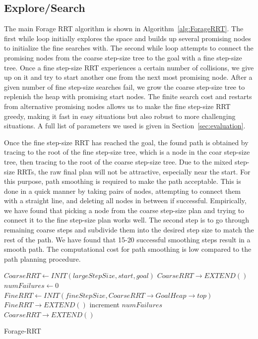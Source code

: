 \documentclass[conference]{IEEEtran}
\begin{document}
\subsection{Explore/Search}
The main Forage RRT algorithm is shown in Algorithm~\ref{alg:ForageRRT}. The
first while loop initially explores the space and builds up several promising 
nodes to initialize the fine searches with. The second while loop attempts to 
connect the promising nodes from the coarse step-size tree to the goal with a 
fine step-size tree. Once a fine step-size RRT experiences a certain number 
of collisions, we give up on it and try to start another one from the next 
most promising node. After a given number of fine step-size searches fail, 
we grow the coarse step-size tree to replenish the heap with promising 
start nodes. The finite search cost and restarts from alternative promising
nodes allows us to make the fine step-size RRT greedy, making it fast in
easy situations but also robust to more challenging situations. A full list
of parameters we used is given in Section~\ref{sec:evaluation}.

Once the fine step-size RRT has reached the goal, the found path is obtained
by tracing to the root of the fine step-size tree, which is a node in the
coar step-size tree, then tracing to the root of the coarse step-size tree.
Due to the mixed step-size RRTs, the raw final plan will not be attractive, 
especially near the start. For this purpose, path smoothing is required to 
make the path acceptable. This is done in a quick manner by taking pairs of
nodes, attempting to connect them with a straight line, and deleting all
nodes in between if successful. Empirically, we have found that
picking a node from the coarse step-size plan and trying to connect it to 
the fine step-size plan works well.  The second step is to go through
remaining coarse steps and subdivide them into the desired step size to
match the rest of the path.  We have found that 15-20 successful smoothing 
steps result in a smooth path.  The computational cost for path smoothing is
low compared to the path planning procedure.

\begin{algorithm}
  \label{alg:ForageRRT}
  \SetAlgoLined
  $CoarseRRT \leftarrow INIT(largeStepSize, start, goal)$\;
   {
	$CoarseRRT \rightarrow EXTEND()$\;
   }
   {
    $numFailures \leftarrow 0$\;
	$FineRRT \leftarrow INIT(fineStepSize, 
	                         CoarseRRT \rightarrow GoalHeap \rightarrow top)$\;
	 {
	  $FineRRT \rightarrow EXTEND()$\;
	 }
	increment $numFailures$ \;
	 {
	   {
		$CoarseRRT \rightarrow EXTEND()$\;
	   }
	 }
   }
  \caption{Forage-RRT}
\end{algorithm}
\end{document}
